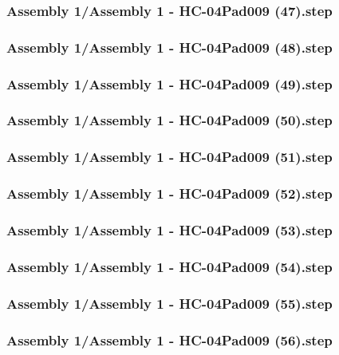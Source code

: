 \documentclass[a4paper,12pt]{article}
\begin{document}
\subsubsection{Assembly 1/Assembly 1 - HC-04Pad009 (47).step}

\subsubsection{Assembly 1/Assembly 1 - HC-04Pad009 (48).step}

\subsubsection{Assembly 1/Assembly 1 - HC-04Pad009 (49).step}

\subsubsection{Assembly 1/Assembly 1 - HC-04Pad009 (50).step}

\subsubsection{Assembly 1/Assembly 1 - HC-04Pad009 (51).step}

\subsubsection{Assembly 1/Assembly 1 - HC-04Pad009 (52).step}

\subsubsection{Assembly 1/Assembly 1 - HC-04Pad009 (53).step}

\subsubsection{Assembly 1/Assembly 1 - HC-04Pad009 (54).step}

\subsubsection{Assembly 1/Assembly 1 - HC-04Pad009 (55).step}

\subsubsection{Assembly 1/Assembly 1 - HC-04Pad009 (56).step}

\end{document}
